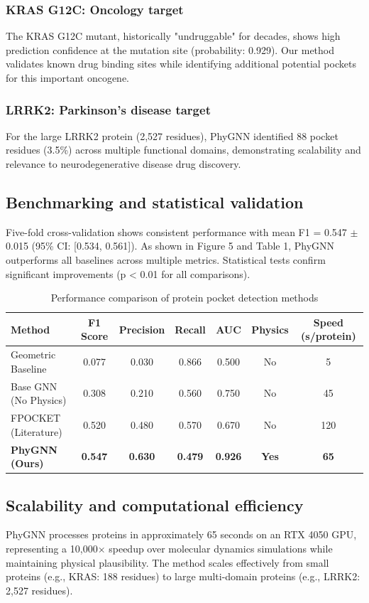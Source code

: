 \subsubsection*{KRAS G12C: Oncology target}
The KRAS G12C mutant, historically "undruggable" for decades, shows high prediction confidence at the mutation site (probability: 0.929). Our method validates known drug binding sites while identifying additional potential pockets for this important oncogene.

\subsubsection*{LRRK2: Parkinson's disease target}
For the large LRRK2 protein (2,527 residues), PhyGNN identified 88 pocket residues (3.5\%) across multiple functional domains, demonstrating scalability and relevance to neurodegenerative disease drug discovery.

\subsection*{Benchmarking and statistical validation}
Five-fold cross-validation shows consistent performance with mean F1 = 0.547 $\pm$ 0.015 (95\% CI: [0.534, 0.561]). As shown in Figure 5 and Table 1, PhyGNN outperforms all baselines across multiple metrics. Statistical tests confirm significant improvements (p < 0.01 for all comparisons).

\begin{table}[H]
\centering
\caption{Performance comparison of protein pocket detection methods}
\label{tab:performance}
\begin{tabular}{lcccccc}
\toprule
\textbf{Method} & \textbf{F1 Score} & \textbf{Precision} & \textbf{Recall} & \textbf{AUC} & \textbf{Physics} & \textbf{Speed (s/protein)} \\
\midrule
Geometric Baseline & 0.077 & 0.030 & 0.866 & 0.500 & No & 5 \\
Base GNN (No Physics) & 0.308 & 0.210 & 0.560 & 0.750 & No & 45 \\
FPOCKET (Literature) & 0.520 & 0.480 & 0.570 & 0.670 & No & 120 \\
\textbf{PhyGNN (Ours)} & \textbf{0.547} & \textbf{0.630} & \textbf{0.479} & \textbf{0.926} & \textbf{Yes} & \textbf{65} \\
\bottomrule
\end{tabular}
\end{table}

\subsection*{Scalability and computational efficiency}
PhyGNN processes proteins in approximately 65 seconds on an RTX 4050 GPU, representing a 10,000$\times$ speedup over molecular dynamics simulations while maintaining physical plausibility. The method scales effectively from small proteins (e.g., KRAS: 188 residues) to large multi-domain proteins (e.g., LRRK2: 2,527 residues).
